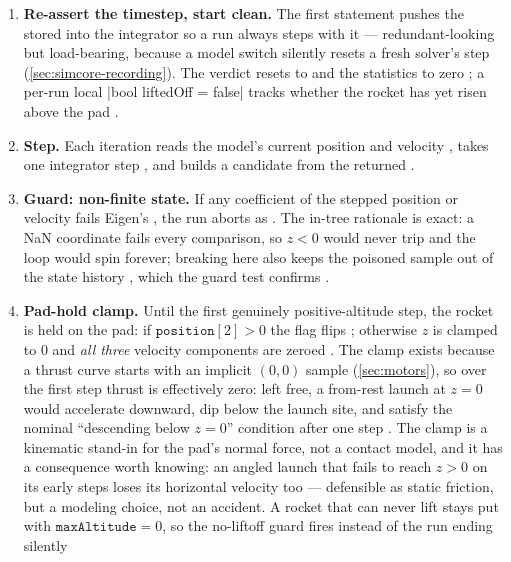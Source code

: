 \begin{enumerate}
\item \textbf{Re-assert the timestep, start clean.} The first statement pushes the stored
   into the integrator so a run always steps with it 
  --- redundant-looking but load-bearing, because a model switch silently resets a fresh
  solver's step (\cref{sec:simcore-recording}). The verdict resets to  and the
  statistics to zero ; a per-run local
  \cppinline|bool liftedOff = false| tracks whether the rocket has yet risen above the pad
  .
\item \textbf{Step.} Each iteration reads the model's current position and velocity
  , takes one integrator step
  , and builds a candidate  from the returned
   .
\item \textbf{Guard: non-finite state.} If any coefficient of the stepped position or velocity
  fails Eigen's , the run aborts as 
  . The in-tree rationale is exact: a NaN coordinate fails every
  comparison, so $z<0$ would never trip and the loop would spin forever; breaking here also
  keeps the poisoned sample out of the state history , which the
  guard test confirms .
\item \textbf{Pad-hold clamp.} Until the first genuinely positive-altitude step, the rocket is
  held on the pad: if $\mathtt{position}[2] > 0$ the flag flips ;
  otherwise $z$ is clamped to $0$ and \emph{all three} velocity components are zeroed
  . The clamp exists because a thrust curve starts with an implicit
  $(0,0)$ sample (\cref{sec:motors}), so over the first step thrust is effectively zero: left
  free, a from-rest launch at $z=0$ would accelerate downward, dip below the launch site, and
  satisfy the nominal ``descending below $z=0$'' condition after one step
  . The clamp is a kinematic stand-in for the pad's normal force,
  not a contact model, and it has a consequence worth knowing: an angled launch that fails to
  reach $z>0$ on its early steps loses its horizontal velocity too --- defensible as static
  friction, but a modeling choice, not an accident. A rocket that can never lift stays put with
  $\mathtt{maxAltitude}=0$, so the no-liftoff guard fires instead of the run ending silently

\end{enumerate}
